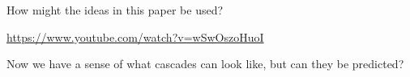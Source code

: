\documentclass[aspectratio=169]{beamer}
\begin{document}
\begin{frame}

How might the ideas in this paper be used?
\vfill

\textcolor{blue}{\url{https://www.youtube.com/watch?v=wSwOszoHuoI}}

\end{frame}
\begin{frame}

Now we have a sense of what cascades can look like, but can they be predicted?

\end{frame}
\end{document}

